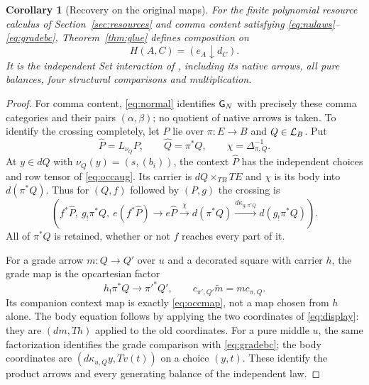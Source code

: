 \documentclass[11pt]{article}
\numberwithin{equation}{section}
\newtheorem{corollary}[theorem]{Corollary}
\theoremstyle{definition}\newtheorem{definition}[theorem]{Definition}
\begin{document}
\begin{corollary}[Recovery on the original maps]\label{cor:set}
For the finite polynomial resource calculus of Section~\ref{sec:resources}
and comma content satisfying \eqref{eq:nulaws}--\eqref{eq:gradebc},
Theorem~\ref{thm:glue} defines composition on
\[
                       H(A,C)=(e_A\downarrow d_C).
\]
It is the independent Set interaction of \cite{O1}, including its native
arrows, all pure balances, four structural comparisons and multiplication.
\end{corollary}
\begin{proof}
For comma content, \eqref{eq:normal} identifies $\mathsf G_N$ with precisely
these comma categories and their pairs $(\alpha,\beta)$; no quotient of
native arrows is taken. To identify the crossing completely, let $P$ lie
over $\pi:E\to B$ and $Q\in\mathcal L_B$. Put
\[
 \widehat P=L_{\nu_Q}P,\qquad \widehat Q=\pi^*Q,
 \qquad \chi=\Delta_{\pi,Q}^{-1}.
\]
At $y\in dQ$ with $\nu_Q(y)=(s,(b_i))$, the context $\widehat P$
has the independent choices and row tensor of \eqref{eq:occaug}.
Its carrier is $dQ\times_{TB}TE$ and $\chi$ is its body into
$d(\pi^*Q)$. Thus for $(Q,f)$ followed by $(P,g)$ the crossing is
\begin{equation}\label{eq:setcut}
 \left(f^*\widehat P,\ g_!\pi^*Q,\
 e(f^*\widehat P)\longrightarrow e\widehat P
    \xrightarrow{\chi}d(\pi^*Q)
    \xrightarrow{d\kappa_{g,\pi^*Q}}d(g_!\pi^*Q)\right).
\end{equation}
All of $\pi^*Q$ is retained, whether or not $f$ reaches every part of it.

For a grade arrow $m:Q\to Q'$ over $u$ and a decorated square with
carrier $h$, the grade map is the opcartesian factor
\begin{equation}\label{eq:nativegrade}
 h_!\pi^*Q\longrightarrow\pi'^*Q',\qquad
 c_{\pi',Q'}\widetilde m=m c_{\pi,Q}.
\end{equation}
Its companion context map is exactly \eqref{eq:occmap}, not a map chosen
from $h$ alone. The body equation follows by applying the two coordinates
of \eqref{eq:display}: they are $(dm,Th)$ applied to the old coordinates.
For a pure middle $u$, the same factorization identifies the grade
comparison with \eqref{eq:gradebc}; the body coordinates are
$(d\kappa_{u,Q}y,Tv(t))$ on a choice $(y,t)$. These identify the
product arrows and every generating balance of the independent law.


\end{proof}
\end{document}
